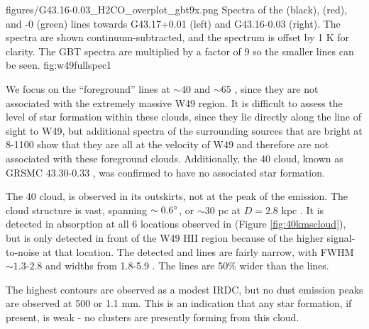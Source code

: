 
{figures/G43.16-0.03_H2CO_overplot_gbt9x.png}
{Spectra of the \formaldehyde \oneone (black), \twotwo (red), and -0 (green) lines towards G43.17+0.01 (left) and G43.16-0.03 (right).
The \formaldehyde spectra are shown continuum-subtracted, and the \thirteenco
spectrum is offset by 1 K for clarity.  The GBT \twotwo spectra are multiplied
by a factor of 9 so the smaller lines can be seen.
}{fig:w49fullspec}{1}

We focus on the ``foreground'' lines at $\sim40$ \kms and $\sim65$ \kms, since
they are not associated with the extremely massive W49 region.  It is difficult
to assess the level of star formation within these clouds, since they lie
directly along the line of sight to W49, but additional \formaldehyde spectra
of the surrounding sources that are bright at 8-1100 \um show that they are all
at the velocity of W49 and therefore are not associated with these foreground
clouds.  Additionally, the 40 \kms cloud, known as GRSMC 43.30-0.33
\citep{Simon2001a}, was confirmed to have no associated star
formation.

The 40 \kms cloud, is observed in
its outskirts, not at the peak of the \thirteenco emission.  The cloud
structure is vast, spanning $\sim0.6^{\circ}$, or $\sim30$ pc at $D=2.8$ kpc
\citep{Roman-Duval2009a}.  It is detected in \oneone absorption at all 6
locations observed in \formaldehyde (Figure \ref{fig:40kmscloud}), but \twotwo
is only detected in front of the W49 HII region because of the higher
signal-to-noise at that location.  The detected \thirteenco and \formaldehyde
lines are fairly narrow, with \formaldehyde FWHM $\sim1.3$-$2.8$ \kms and
\thirteenco widths from 1.8-5.9 \kms.  The \thirteenco lines are 50\% wider
than the \formaldehyde lines.

The highest \thirteenco contours are observed as a modest IRDC, but no dust
emission peaks are observed at 500 \um or 1.1 mm.  This is an indication that
any star formation, if present, is weak - no clusters are presently forming
from this cloud.

